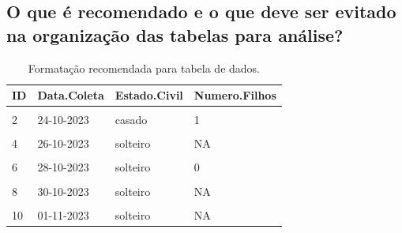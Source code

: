 \documentclass[
  a4paper,
]{book}
\begin{document}
\hypertarget{o-que-uxe9-recomendado-e-o-que-deve-ser-evitado-na-organizauxe7uxe3o-das-tabelas-para-anuxe1lise}{%
\subsection{O que é recomendado e o que deve ser evitado na organização das tabelas para análise?}\label{o-que-uxe9-recomendado-e-o-que-deve-ser-evitado-na-organizauxe7uxe3o-das-tabelas-para-anuxe1lise}}

\begin{table}

\caption{\label{tab:tabela-recomendada}Formatação recomendada para tabela de dados.}
\centering
\begin{tabu} to 
\toprule
\textbf{ID} & \textbf{Data.Coleta} & \textbf{Estado.Civil} & \textbf{Numero.Filhos}\\
\midrule
{} &  &  & \\
2 & 24-10-2023 & casado & 1\\
 &  &  & \\
4 & 26-10-2023 & solteiro & NA\\
 &  &  & \\
6 & 28-10-2023 & solteiro & 0\\
 &  &  & \\
8 & 30-10-2023 & solteiro & NA\\
 &  &  & \\
10 & 01-11-2023 & solteiro & NA\\
\bottomrule
\end{tabu}
\end{table}
\end{document}
